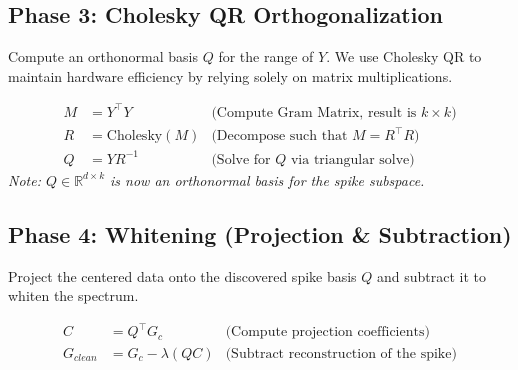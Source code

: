 \subsection*{Phase 3: Cholesky QR Orthogonalization}
Compute an orthonormal basis $Q$ for the range of $Y$. We use Cholesky QR to maintain hardware efficiency by relying solely on matrix multiplications.

\begin{align}
    M &= Y^\top Y & \text{(Compute Gram Matrix, result is $k \times k$)} \\
    R &= \text{Cholesky}(M) & \text{(Decompose such that $M = R^\top R$)} \\
    Q &= Y R^{-1} & \text{(Solve for $Q$ via triangular solve)}
\end{align}
\textit{Note: $Q \in \mathbb{R}^{d \times k}$ is now an orthonormal basis for the spike subspace.}

\subsection*{Phase 4: Whitening (Projection \& Subtraction)}
Project the centered data onto the discovered spike basis $Q$ and subtract it to whiten the spectrum.

\begin{align}
    C &= Q^\top G_c & \text{(Compute projection coefficients)} \\
    G_{clean} &= G_c - \lambda (Q C) & \text{(Subtract reconstruction of the spike)}
\end{align}